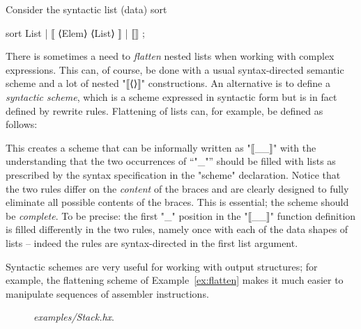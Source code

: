 \documentclass[11pt]{article} %
\newenvironment{figureunit}[1][]{\def\figureunitcaption{#1}}{\figureunitcaption}
\renewenvironment{figureunit}[1][]{\def\thefigureunitcaption{#1}%
  \begin{lrbox}{\savedfigureunit}\begin{minipage}{\linewidth}}%
{\thefigureunitcaption\vspace{1ex}\end{minipage}\end{lrbox}%
  \colorbox{blue!10}{\usebox{\savedfigureunit}}}
\begin{document}
\begin{example}\label{ex:flatten}
  Consider the syntactic list (data) sort
  \begin{hacs}[xleftmargin=\parindent,xrightmargin=\parindent]
sort List | ⟦ ⟨Elem⟩ ⟨List⟩ ⟧ | ⟦⟧ ;
  \end{hacs}
  There is sometimes a need to \emph{flatten} nested lists when working with complex expressions.
  This can, of course, be done with a usual syntax-directed semantic scheme and a lot of nested
  "⟦⟨⟩⟧" constructions. An alternative is to define a \emph{syntactic scheme}, which is a scheme
  expressed in syntactic form but is in fact defined by rewrite rules. Flattening of lists can, for
  example, be defined as follows:
  This creates a scheme that can be informally written as "⟦{_}_⟧" with the understanding that the
  two occurrences of ``"_"'' should be filled with lists as prescribed by the syntax specification
  in the "scheme" declaration. Notice that the two rules differ on the \emph{content} of the braces
  and are clearly designed to fully eliminate all possible contents of the braces. This is
  essential; the scheme should be \emph{complete}. To be precise: the first "_" position in the
  "⟦{_}_⟧" function definition is filled differently in the two rules, namely once with each of the
  data shapes of lists -- indeed the rules are syntax-directed in the first list argument.
\end{example}

Syntactic schemes are very useful for working with output structures; for example, the flattening
scheme of Example~\ref{ex:flatten} makes it much easier to manipulate sequences of assembler
instructions.

\begin{figure}[p]
  \begin{figureunit}[
      \caption{\emph{examples/Stack.hx}.}
      \label{fig:stack}
    ]
  \end{figureunit}
\end{figure}
\end{document}
